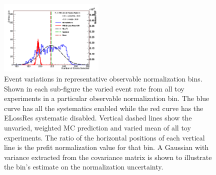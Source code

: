 \begin{figure}
\begin{centering}
{\begin{centering}
\includegraphics[width=0.445\textwidth]{Chapters/Figures/P0DBANFFParameterization/P0DObsnormSpreadNumubarRHCCCNTrks}
\par\end{centering}
}
\par\end{centering}
\begin{centering}
\par\end{centering}
\caption[Event Variations in Observable Normalization Bins]{Event variations in representative observable normalization bins.
Shown in each sub-figure the varied event rate from all toy experiments
in a particular observable normalization bin. The blue curve has all
the systematics enabled while the red curve has the ELossRes systematic
disabled. Vertical dashed lines show the unvaried, weighted MC prediction
and varied mean of all toy experiments. The ratio of the horizontal
positions of each vertical line is the prefit normalization value
for that bin. A Gaussian with variance extracted from the covariance
matrix is shown to illustrate the bin's estimate on the normalization
uncertainty. \label{fig:Representative-event-variations}}
\end{figure}

